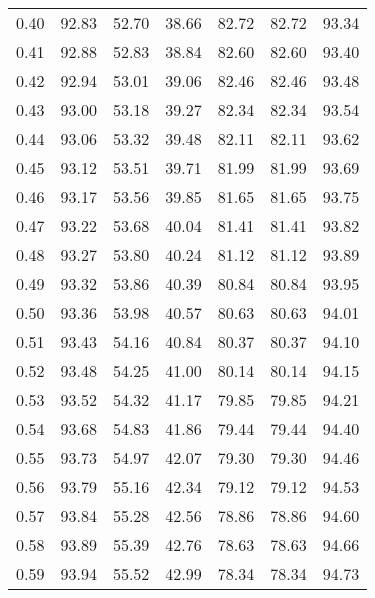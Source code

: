 \begin{tabular}{|c|c|c|c|c|c|c|}
      0.40 &     92.83 &     52.70 &      38.66 &   82.72 &      82.72 &         93.34 \\
      0.41 &     92.88 &     52.83 &      38.84 &   82.60 &      82.60 &         93.40 \\
      0.42 &     92.94 &     53.01 &      39.06 &   82.46 &      82.46 &         93.48 \\
      0.43 &     93.00 &     53.18 &      39.27 &   82.34 &      82.34 &         93.54 \\
      0.44 &     93.06 &     53.32 &      39.48 &   82.11 &      82.11 &         93.62 \\
      0.45 &     93.12 &     53.51 &      39.71 &   81.99 &      81.99 &         93.69 \\
      0.46 &     93.17 &     53.56 &      39.85 &   81.65 &      81.65 &         93.75 \\
      0.47 &     93.22 &     53.68 &      40.04 &   81.41 &      81.41 &         93.82 \\
      0.48 &     93.27 &     53.80 &      40.24 &   81.12 &      81.12 &         93.89 \\
      0.49 &     93.32 &     53.86 &      40.39 &   80.84 &      80.84 &         93.95 \\
      0.50 &     93.36 &     53.98 &      40.57 &   80.63 &      80.63 &         94.01 \\
      0.51 &     93.43 &     54.16 &      40.84 &   80.37 &      80.37 &         94.10 \\
      0.52 &     93.48 &     54.25 &      41.00 &   80.14 &      80.14 &         94.15 \\
      0.53 &     93.52 &     54.32 &      41.17 &   79.85 &      79.85 &         94.21 \\
      0.54 &     93.68 &     54.83 &      41.86 &   79.44 &      79.44 &         94.40 \\
      0.55 &     93.73 &     54.97 &      42.07 &   79.30 &      79.30 &         94.46 \\
      0.56 &     93.79 &     55.16 &      42.34 &   79.12 &      79.12 &         94.53 \\
      0.57 &     93.84 &     55.28 &      42.56 &   78.86 &      78.86 &         94.60 \\
      0.58 &     93.89 &     55.39 &      42.76 &   78.63 &      78.63 &         94.66 \\
      0.59 &     93.94 &     55.52 &      42.99 &   78.34 &      78.34 &         94.73 \\

\end{tabular}
